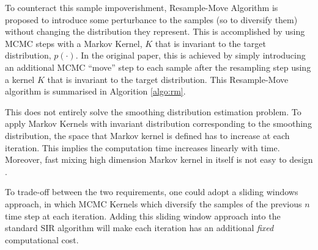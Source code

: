 To counteract this sample impoverishment, Resample-Move Algorithm \cite{BC01} is proposed to introduce some perturbance to the samples (so to diversify them) without changing the distribution they represent. This is accomplished by using MCMC steps with a Markov Kernel, $K$ that is invariant to the target distribution, $p(\cdot)$. In the original paper, this is achieved by simply introducing an additional MCMC ``move'' step to each sample after the resampling step using a kernel $K$  that is invariant to the target distribution. This Resample-Move algorithm is summarised in Algorition \ref{algo:rm}.

This does not entirely solve the smoothing distribution estimation problem. To apply Markov Kernels with invariant distribution corresponding to the smoothing distribution, the space that Markov kernel is defined has to increase at each iteration. This implies the computation time increases linearly with time. Moreover, fast mixing high dimension Markov kernel in itself is not easy to design \cite{JAM10}.

To trade-off between the two requirements, one could adopt a sliding windows approach, in which MCMC Kernels which diversify the samples of the previous $n$ time step at each iteration. Adding this sliding window approach into the standard SIR algorithm will make each iteration has an additional \emph{fixed} computational cost.

